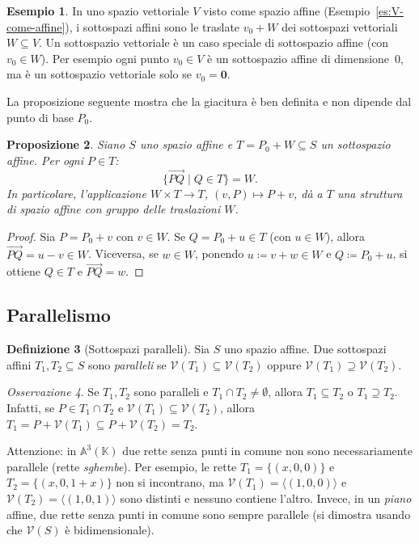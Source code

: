 \documentclass[11pt, a4paper]{book}
\theoremstyle{definition}
\newtheorem{definizione}{Definizione}[section]
\newtheorem{esempio}[definizione]{Esempio}
\theoremstyle{plain}
\newtheorem{proposizione}[definizione]{Proposizione}
\theoremstyle{remark}
\newtheorem{osservazione}[definizione]{Osservazione}
\newcommand{\K}{\mathbb{K}}
\newcommand{\VV}{\mathcal{V}}   %
\begin{document}
\begin{exbox}
\begin{esempio}
In uno spazio vettoriale $V$ visto come spazio affine (Esempio~\ref{es:V-come-affine}), i sottospazi affini sono le traslate $v_0 + W$ dei sottospazi vettoriali $W \subseteq V$. Un sottospazio vettoriale è un caso speciale di sottospazio affine (con $v_0 \in W$). Per esempio ogni punto $v_0 \in V$ è un sottospazio affine di dimensione~$0$, ma è un sottospazio vettoriale solo se $v_0 = \mathbf{0}$.
\end{esempio}
\end{exbox}

La proposizione seguente mostra che la giacitura è ben definita e non dipende dal punto di base $P_0$.

\begin{proposizione}
\label{prop:giacitura}
Siano $S$ uno spazio affine e $T = P_0 + W \subseteq S$ un sottospazio affine. Per ogni $P \in T$:
\[
  \{ \overrightarrow{PQ} \mid Q \in T \} = W.
\]
In particolare, l'applicazione $W \times T \to T$, $(v, P) \mapsto P + v$, dà a $T$ una struttura di spazio affine con gruppo delle traslazioni $W$.
\end{proposizione}

\begin{proof}
Sia $P = P_0 + v$ con $v \in W$. Se $Q = P_0 + u \in T$ (con $u \in W$), allora $\overrightarrow{PQ} = u - v \in W$. Viceversa, se $w \in W$, ponendo $u \coloneqq v + w \in W$ e $Q \coloneqq P_0 + u$, si ottiene $Q \in T$ e $\overrightarrow{PQ} = w$.
\end{proof}

\subsection{Parallelismo}

\begin{defbox}
\begin{definizione}[Sottospazi paralleli]
Sia $S$ uno spazio affine. Due sottospazi affini $T_1, T_2 \subseteq S$ sono \emph{paralleli} se $\VV(T_1) \subseteq \VV(T_2)$ oppure $\VV(T_1) \supseteq \VV(T_2)$.
\end{definizione}
\end{defbox}

\begin{osservazione}
Se $T_1, T_2$ sono paralleli e $T_1 \cap T_2 \neq \emptyset$, allora $T_1 \subseteq T_2$ o $T_1 \supseteq T_2$. Infatti, se $P \in T_1 \cap T_2$ e $\VV(T_1) \subseteq \VV(T_2)$, allora $T_1 = P + \VV(T_1) \subseteq P + \VV(T_2) = T_2$.

Attenzione: in $\mathbb{A}^3(\K)$ due rette senza punti in comune non sono necessariamente parallele (rette \emph{sghembe}). Per esempio, le rette $T_1 = \{(x,0,0)\}$ e $T_2 = \{(x,0,1+x)\}$ non si incontrano, ma $\VV(T_1) = \langle(1,0,0)\rangle$ e $\VV(T_2) = \langle(1,0,1)\rangle$ sono distinti e nessuno contiene l'altro. Invece, in un \emph{piano} affine, due rette senza punti in comune sono sempre parallele (si dimostra usando che $\VV(S)$ è bidimensionale).
\end{osservazione}
\end{document}
